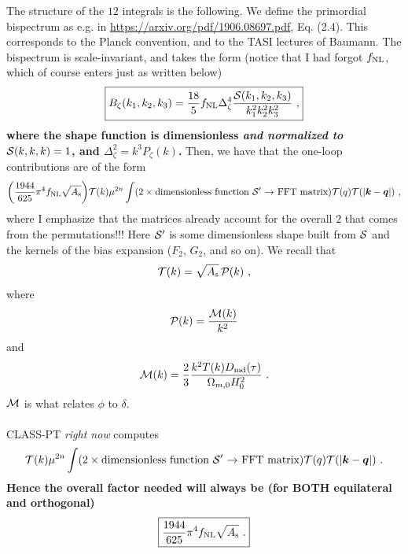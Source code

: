 \documentclass[aps,prd,amsmath,floats,floatfix,superscriptaddress,nofootinbib%
]{revtex4}%
\renewcommand\({\left(}
\renewcommand\){\right)}
\renewcommand\[{\left[}
\renewcommand\]{\right]}
\renewcommand{\vec}{\bm}
\begin{document}
\noindent The structure of the $12$ integrals is the following. We define the primordial bispectrum as e.g. in \url{https://arxiv.org/pdf/1906.08697.pdf}, Eq. (2.4). This corresponds to the Planck convention, and to the TASI lectures of Baumann. The bispectrum is scale-invariant, and takes the form (notice that I had forgot $f_{\rm NL}$, which of course enters just as written below) 
\begin{equation} 
\boxed{B_\zeta(k_1,k_2,k_3) = \frac{18}{5}f_{\rm NL}\Delta^4_\zeta\frac{{\cal S}(k_1,k_2,k_3)}{k_1^2k_2^2k_3^2}\,\,,} 
\end{equation}
\textbf{where the shape function is dimensionless \emph{and normalized to ${\cal S}(k,k,k)=1$}, and $\Delta^2_\zeta = k^3 P_\zeta(k)$.} Then, we have that the one-loop contributions are of the form 
\begin{equation}
\bigg({\frac{1944}{625}}\pi^4f_{\rm NL}\sqrt{A_{\rm s}}\bigg){\cal T}(k)\mu^{2n}\int(2\times\text{dimensionless function ${\cal S}'$ $\to$ FFT matrix}) {\cal T}(q) {\cal T}(|{\vec{k}-\vec{q}}|)\,\,,
\end{equation} 
where I emphasize that the matrices already account for the overall $2$ that comes from the permutations!!! Here ${\cal S}'$ is some dimensionless shape built from ${\cal S}$ and the kernels of the bias expansion ($F_2$, $G_2$, and so on). We recall that 
\begin{equation}
{\cal T}(k) = \sqrt{A_{\rm s}}\,{\cal P}(k)\,\,, 
\end{equation} 
where 
\begin{equation}
{\cal P}(k) = \frac{{\cal M}(k)}{k^2}%
\end{equation} 
and 
\begin{equation} 
{\cal M}(k) = \frac{2}{3}\frac{k^2T(k)D_{\rm md}(\tau)}{\Omega_{m,0}H^2_0}\,\,. 
\end{equation} 
${\cal M}$ is what relates $\phi$ to $\delta$. 
\\
\\
CLASS-PT \emph{right now} computes 
\begin{equation}
{\cal T}(k)\mu^{2n}\int(2\times\text{dimensionless function ${\cal S}'$ $\to$ FFT matrix}) {\cal T}(q)  {\cal T}(|{\vec{k}-\vec{q}}|)\,\,. 
\end{equation} 
\textbf{Hence the overall factor needed will always be (for BOTH equilateral and orthogonal)} 
\begin{equation}
\boxed{{\frac{1944}{625}}\pi^4f_{\rm NL}\sqrt{A_{\rm s}}%
\,\,.} 
\end{equation} 
\end{document}
